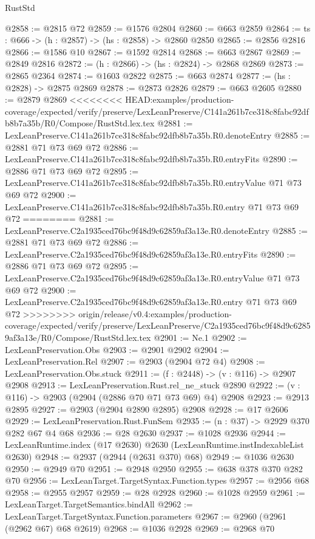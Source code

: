 \begin{lexlean}{RustStd}
\begin{coremodule}
{\begin{coremodule}
{{{{{{{@2858 := @2815 @72
@2859 := @1576 @2804
@2860 := @663 @2859
@2864 := {ts : @666} -> (h : @2857) -> (hs : @2858) -> @2860 @2850
@2865 := @2856 @2816
@2866 := @1586 @10
@2867 := @1592 @2814
@2868 := @663 @2867
@2869 := @2849 @2816
@2872 := (h : @2866) -> (hs : @2824) -> @2868 @2869
@2873 := @2865 @2364
@2874 := @1603 @2822
@2875 := @663 @2874
@2877 := (hs : @2828) -> @2875 @2869
@2878 := @2873 @2826
@2879 := @663 @2605
@2880 := @2879 @2869
<<<<<<<< HEAD:examples/production-coverage/expected/verify/preserve/LexLeanPreserve/C141a261b7ce318c8fabc92dfb8b7a35b/R0/Compose/RustStd.lex.tex
@2881 := LexLeanPreserve.C141a261b7ce318c8fabc92dfb8b7a35b.R0.denoteEntry
@2885 := @2881 @71 @73 @69 @72
@2886 := LexLeanPreserve.C141a261b7ce318c8fabc92dfb8b7a35b.R0.entryFits
@2890 := @2886 @71 @73 @69 @72
@2895 := LexLeanPreserve.C141a261b7ce318c8fabc92dfb8b7a35b.R0.entryValue @71 @73 @69 @72
@2900 := LexLeanPreserve.C141a261b7ce318c8fabc92dfb8b7a35b.R0.entry @71 @73 @69 @72
========
@2881 := LexLeanPreserve.C2a1935ced76bc9f48d9c62859af3a13e.R0.denoteEntry
@2885 := @2881 @71 @73 @69 @72
@2886 := LexLeanPreserve.C2a1935ced76bc9f48d9c62859af3a13e.R0.entryFits
@2890 := @2886 @71 @73 @69 @72
@2895 := LexLeanPreserve.C2a1935ced76bc9f48d9c62859af3a13e.R0.entryValue @71 @73 @69 @72
@2900 := LexLeanPreserve.C2a1935ced76bc9f48d9c62859af3a13e.R0.entry @71 @73 @69 @72
>>>>>>>> origin/release/v0.4:examples/production-coverage/expected/verify/preserve/LexLeanPreserve/C2a1935ced76bc9f48d9c62859af3a13e/R0/Compose/RustStd.lex.tex
@2901 := Ne.{1}
@2902 := LexLeanPreservation.Obs
@2903 := @2901 @2902
@2904 := LexLeanPreservation.Rel
@2907 := @2903 (@2904 @72 @4)
@2908 := LexLeanPreservation.Obs.stuck
@2911 := (f : @2448) -> (v : @116) -> @2907 @2908
@2913 := LexLeanPreservation.Rust.rel_ne_stuck @2890
@2922 := (v : @116) -> @2903 (@2904 (@2886 @70 @71 @73 @69) @4) @2908
@2923 := @2913 @2895
@2927 := @2903 (@2904 @2890 @2895) @2908
@2928 := @17 @2606
@2929 := LexLeanPreservation.Rust.FunSem
@2935 := (n : @37) -> @2929 @370 @282 @67 @4 @68
@2936 := @28 @2630
@2937 := @1028 @2936
@2944 := LexLeanRuntime.index (@17 @2630) @2630 (LexLeanRuntime.instIndexableList @2630)
@2948 := @2937 (@2944 (@2631 @370) @68)
@2949 := @1036 @2630
@2950 := @2949 @70
@2951 := @2948 @2950
@2955 := @638 @378 @370 @282 @70
@2956 := LexLeanTarget.TargetSyntax.Function.types
@2957 := @2956 @68
@2958 := @2955 @2957
@2959 := @28 @2928
@2960 := @1028 @2959
@2961 := LexLeanTarget.TargetSemantics.bindAll
@2962 := LexLeanTarget.TargetSyntax.Function.parameters
@2967 := @2960 (@2961 (@2962 @67) @68 @2619)
@2968 := @1036 @2928
@2969 := @2968 @70
}}}}}}}
\end{coremodule}}
\end{coremodule}
\end{lexlean}
